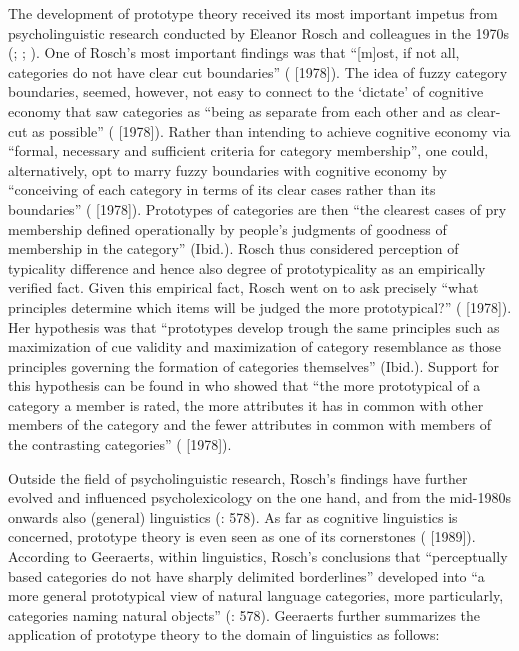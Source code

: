 The development of prototype theory received its most important impetus from psycholinguistic research conducted by Eleanor Rosch and colleagues in the 1970s (\citealt{rosch_cognitive_1975}; \citealt{rosch_family_1975}; \citealt{Rosch1978}). One of Rosch’s most important findings was that “[m]ost, if not all, categories do not have clear cut boundaries” (\citealt[196]{margolis_principles_1999} [1978]). The idea of fuzzy category boundaries, seemed, however, not easy to connect to the ‘dictate’ of cognitive economy that saw categories as “being as separate from each other and as clear-cut as possible” (\citealt[196]{margolis_principles_1999} [1978]). Rather than intending to achieve cognitive economy via “formal, necessary and sufficient criteria for category membership”, one could, alternatively, opt to marry fuzzy boundaries with cognitive economy by “conceiving of each category in terms of its clear cases rather than its boundaries” (\citealt[196]{margolis_principles_1999} [1978]). Prototypes of categories are then “the clearest cases of pry membership defined operationally by people’s judgments of goodness of membership in the category” (Ibid.). Rosch thus considered perception of typicality difference and hence also degree of prototypicality as an empirically verified fact. Given this empirical fact, Rosch went on to ask precisely “what principles determine which items will be judged the more prototypical?” (\citealt[197]{margolis_principles_1999} [1978]). Her hypothesis was that “prototypes develop trough the same principles such as maximization of cue validity and maximization of category resemblance as those principles governing the formation of categories themselves” (Ibid.). Support for this hypothesis can be found in \citet{rosch_family_1975} who showed that “the more prototypical of a category a member is rated, the more attributes it has in common with other members of the category and the fewer attributes in common with members of the contrasting categories” (\citealt[197]{margolis_principles_1999} [1978]).



Outside the field of psycholinguistic research, Rosch’s findings have further evolved and influenced psycholexicology on the one hand, and from the mid-1980s onwards also (general) linguistics (\citealt{allan_lexical_2013}: 578). As far as cognitive linguistics is concerned, prototype theory is even seen as one of its cornerstones (\citealt[145]{Geeraerts2006}  [1989]). According to Geeraerts, within linguistics, Rosch’s conclusions that “perceptually based categories do not have sharply delimited borderlines” developed into “a more general prototypical view of natural language categories, more particularly, categories naming natural objects” (\citealt{allan_lexical_2013}: 578). Geeraerts further summarizes the application of prototype theory to the domain of linguistics as follows:


